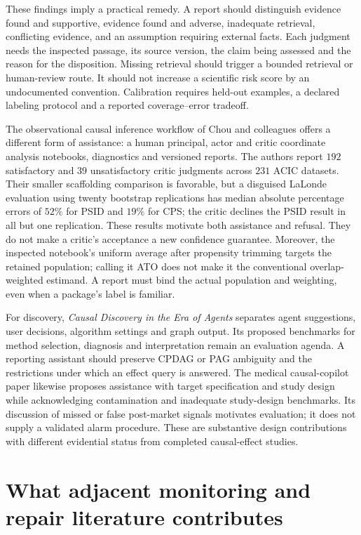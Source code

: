 These findings imply a practical remedy. A report should distinguish evidence
found and supportive, evidence found and adverse, inadequate retrieval,
conflicting evidence, and an assumption requiring external facts. Each judgment
needs the inspected passage, its source version, the claim being assessed and
the reason for the disposition. Missing retrieval should trigger a bounded
retrieval or human-review route. It should not increase a scientific risk score
by an undocumented convention. Calibration requires held-out examples, a
declared labeling protocol and a reported coverage--error tradeoff.

The observational causal inference workflow of Chou and colleagues offers a
different form of assistance: a human principal, actor and critic coordinate
analysis notebooks, diagnostics and versioned reports. The authors report
\(192\) satisfactory and \(39\) unsatisfactory critic judgments across \(231\)
ACIC datasets. Their smaller scaffolding comparison is favorable, but a
disguised LaLonde evaluation using twenty bootstrap replications has median
absolute percentage errors of \(52\%\) for PSID and \(19\%\) for CPS; the critic
declines the PSID result in all but one replication. These results motivate
both assistance and refusal. They do not make a critic's acceptance a new
confidence guarantee. Moreover, the inspected notebook's uniform average after
propensity trimming targets the retained population; calling it ATO does not
make it the conventional overlap-weighted estimand. A report must bind the
actual population and weighting, even when a package's label is familiar.
\citep{v12_la_2607_22443,v12_la_package_oci_agent}

For discovery, \emph{Causal Discovery in the Era of Agents} separates agent
suggestions, user decisions, algorithm settings and graph output. Its proposed
benchmarks for method selection, diagnosis and interpretation remain an
evaluation agenda. A reporting assistant should preserve CPDAG or PAG ambiguity
and the restrictions under which an effect query is answered. The medical
causal-copilot paper likewise proposes assistance with target specification and
study design while acknowledging contamination and inadequate study-design
benchmarks. Its discussion of missed or false post-market signals motivates
evaluation; it does not supply a validated alarm procedure. These are
substantive design contributions with different evidential status from
completed causal-effect studies.
\citep{v12_la_2606_23608,v12_la_2407_19118}

\section{What adjacent monitoring and repair literature contributes}

